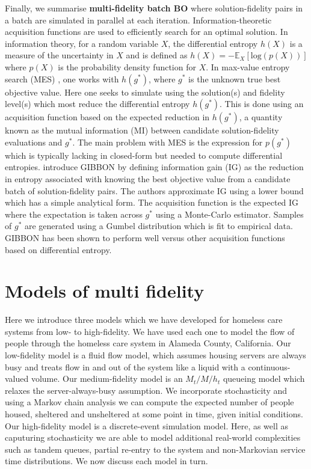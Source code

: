 \documentclass[12pt,a4paper]{article}
\begin{document}
Finally, we summarise \textbf{multi-fidelity batch BO} where solution-fidelity pairs in a batch are simulated in parallel at each iteration. Information-theoretic acquisition functions are used to efficiently search for an optimal solution. In information theory, for a random variable $X$, the differential entropy $h(X)$ is a measure of the uncertainty in $X$ and is defined as $h(X) = -\mathbb{E}_{X}[\text{log}(p(X))]$ where $p(X)$ is the probability density function for $X$. In max-value entropy search (MES) \citep{wang2017max}, one works with $h(g^{*})$, where $g^{*}$ is the unknown true best objective value. Here one seeks to simulate using the solution(s) and fidelity level(s) which most reduce the differential entropy  $h(g^{*})$. This is done using an acquisition function based on the expected reduction in $h(g^{*})$, a quantity known as the mutual information (MI) between candidate solution-fidelity evaluations and $g^{*}$. The main problem with MES is the expression for $p(g^{*})$ which is typically lacking in closed-form but needed to compute differential entropies. \cite{moss2021gibbon} introduce GIBBON by defining information gain (IG) as the reduction in entropy associated with knowing the best objective value from a candidate batch of solution-fidelity pairs. The authors approximate IG using a lower bound which has a simple analytical form. The acquisition function is the expected IG where the expectation is taken across $g^{*}$ using a Monte-Carlo estimator. Samples of $g^{*}$ are generated using a Gumbel distribution which is fit to empirical data. GIBBON has been shown to perform well versus other acquisition functions based on differential entropy. 

\newpage

\section{Models of multi fidelity} \label{models}
%
Here we introduce three models which we have developed for homeless care systems from low- to high-fidelity. We have used each one to model the flow of people through the homeless care system in Alameda County, California. Our low-fidelity model is a fluid flow model, which assumes housing servers are always busy and treats flow in and out of the system like a liquid with a continuous-valued volume. Our medium-fidelity model is an $M_t/M/h_t$ queueing model which relaxes the server-always-busy assumption. We incorporate stochasticity and using a Markov chain analysis we can compute the expected number of people housed, sheltered and unsheltered at some point in time, given initial conditions. Our high-fidelity model is a discrete-event simulation model. Here, as well as caputuring stochasticity we are able to model additional real-world complexities such as tandem queues, partial re-entry to the system and non-Markovian service time distributions. We now discuss each model in turn.
%
\end{document}
